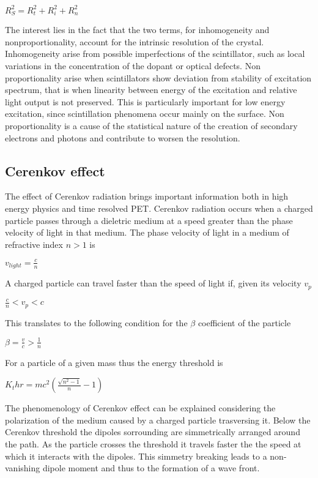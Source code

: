 $R_{S}^{2} = R_{t}^{2} + R_{i}^{2} + R_{n}^{2}$

The interest lies in the fact that the two terms, for inhomogeneity and nonproportionality, account for the intrinsic resolution of the crystal.
Inhomogeneity arise from possible imperfections of the scintillator, such as local variations in the concentration of the dopant or optical defects.
Non proportionality arise when scintillators show deviation from stability of excitation spectrum, that is when linearity between energy of the excitation and relative light output is not preserved. This is particularly important for low energy excitation, since scintillation phenomena occur mainly on the surface. Non proportionality is a cause of the statistical nature of the creation of secondary electrons and photons and contribute to worsen the resolution.

\subsection{Cerenkov effect}
The effect of Cerenkov radiation brings important information both in high energy physics and time resolved PET.
Cerenkov radiation occurs when a charged particle passes through a dieletric medium at a speed greater than the phase velocity of light in that medium.
The phase velocity of light in a medium of refractive index $n > 1$ is

$v_{light} = \frac{c}{n}$

A charged particle can travel faster than the speed of light if, given its velocity $v_{p}$ 

$\frac{c}{n} < v_{p} < c$

This translates to the following condition for the $\beta$ coefficient of the particle

$\beta = \frac{v}{c} > \frac{1}{n}$

For a particle of a given mass thus the energy threshold is

$K_thr = mc^{2}\left( \frac{\sqrt {n^{2}-1}}{n} - 1 \right)$

The phenomenology of Cerenkov effect can be explained considering the polarization of the medium caused by a charged particle trasversing it.
Below the Cerenkov threshold the dipoles sorrounding are simmetrically arranged around the path. As the particle crosses the threshold it travels faster the the speed at which it interacts with the dipoles. This simmetry breaking leads to a non-vanishing dipole moment and thus to the formation of a wave front.

